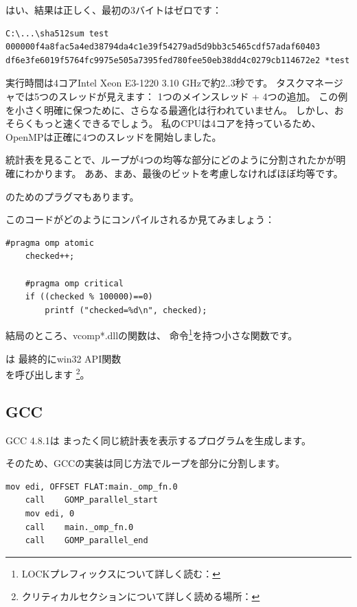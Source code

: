 はい、結果は正しく、最初の3バイトはゼロです：

\begin{lstlisting}
C:\...\sha512sum test
000000f4a8fac5a4ed38794da4c1e39f54279ad5d9bb3c5465cdf57adaf60403
df6e3fe6019f5764fc9975e505a7395fed780fee50eb38dd4c0279cb114672e2 *test
\end{lstlisting}

実行時間は4コアIntel Xeon E3-1220 3.10 GHzで約2..3秒です。
タスクマネージャでは5つのスレッドが見えます：
1つのメインスレッド + 4つの追加。
この例を小さく明確に保つために、さらなる最適化は行われていません。
しかし、おそらくもっと速くできるでしょう。
私の\ac{CPU}は4コアを持っているため、OpenMPは正確に4つのスレッドを開始しました。

統計表を見ることで、ループが4つの均等な部分にどのように分割されたかが明確にわかります。
ああ、まあ、最後のビットを考慮しなければほぼ均等です。

のためのプラグマもあります。

このコードがどのようにコンパイルされるか見てみましょう：

\begin{lstlisting}[style=customc]
	#pragma omp atomic
	checked++;

	#pragma omp critical
	if ((checked % 100000)==0)
		printf ("checked=%d\n", checked);
\end{lstlisting}



結局のところ、vcomp*.dllの関数は、
命令\footnote{
LOCKプレフィックスについて詳しく読む：}を持つ小さな関数です。

は
最終的にwin32 \ac{API}関数\\
を呼び出します
\footnote{クリティカルセクションについて詳しく読める場所：}。

\subsection{GCC}

GCC 4.8.1は
まったく同じ統計表を表示するプログラムを生成します。

そのため、GCCの実装は同じ方法でループを部分に分割します。

\begin{lstlisting}[caption=GCC 4.8.1,style=customasmx86]
	mov	edi, OFFSET FLAT:main._omp_fn.0
	call	GOMP_parallel_start
	mov	edi, 0
	call	main._omp_fn.0
	call	GOMP_parallel_end
\end{lstlisting}

